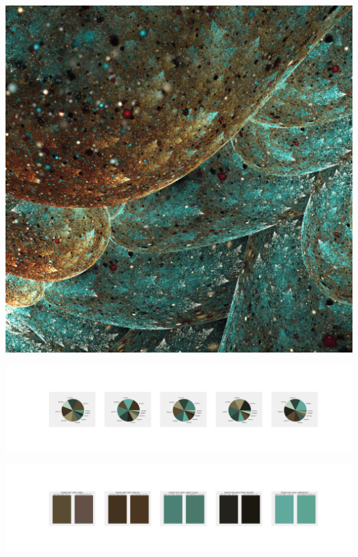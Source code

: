 \documentclass[11pt]{article}
\begin{document}
\begin{landscape}
    \begin{center}
    \includegraphics[width=\textwidth]{./nbimg/file (339).jpg}
    \end{center}

    \begin{center}
    \includegraphics[width=250mm]{./nbimg/pie-266.jpg}
    \end{center}

    \begin{center}
    \includegraphics[width=250mm]{./nbimg/peak-266.jpg}
    \end{center}
    


\end{landscape}
\end{document}
